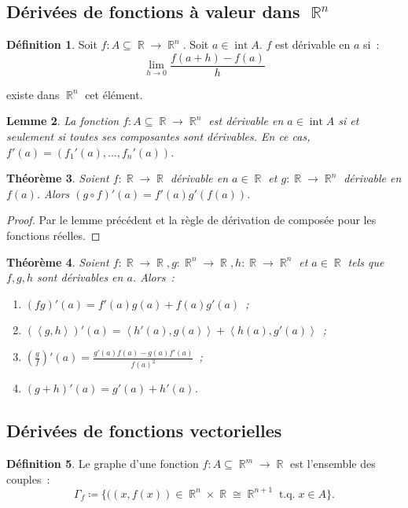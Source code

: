 \documentclass{article}
\DeclareMathOperator{\intr}{int}
\DeclareMathOperator{\R}{\mathbb R}
\DeclareMathOperator{\tq}{ t.q. }
\newcommand{\scpr}[2]{{\left\langle#1, #2\right\rangle}}
\newcommand{\frrn}[2]{#1 : #2 \subseteq \R \to \R^n}
\newcommand{\frmr}[2]{#1 : #2 \subseteq \R^m \to \R}
\newtheorem{thm}{Théorème}[section]
\newtheorem{lem}[thm]{Lemme}
\theoremstyle{definition}
\newtheorem{déf}[thm]{Définition}
\theoremstyle{remark}
\begin{document}
	\subsection{Dérivées de fonctions à valeur dans $\R^n$}

		\begin{déf} Soit $\frrn fA$. Soit $a \in \intr A$. $f$ est dérivable en $a$ si~:
		\[\lim_{h \to 0}\frac {f(a+h)-f(a)}h\]

		existe dans $\R^n$ cet élément. \end{déf}

		\begin{lem} La fonction $\frrn fA$ est dérivable en $a \in \intr A$ si et seulement si toutes ses composantes sont dérivables. En ce cas,
		$f'(a) = (f_1'(a), \ldots, f_n'(a))$. \end{lem}

		\begin{thm} Soient $f : \R \to \R$ dérivable en $a \in \R$ et $g : \R \to \R^n$ dérivable en $f(a)$. Alors $(g \circ f)'(a) = f'(a)g'(f(a))$. \end{thm}

		\begin{proof} Par le lemme précédent et la règle de dérivation de composée pour les fonctions réelles. \end{proof}

		\begin{thm} Soient $f : \R \to \R, g : \R^n \to \R, h : \R \to \R^n$ et $a \in \R$ tels que $f, g, h$ sont dérivables en $a$. Alors~:

		\begin{enumerate}
			\item $(fg)'(a) = f'(a)g(a) + f(a)g'(a)$~;
			\item $(\scpr gh)'(a) = \scpr {h'(a)}{g(a)} + \scpr {h(a)}{g'(a)}$~;
			\item $\left(\frac gf\right)'(a) = \frac {g'(a)f(a) - g(a)f'(a)}{f(a)^2}$~;
			\item $(g+h)'(a) = g'(a) + h'(a)$.
		\end{enumerate}
		\end{thm}

	\subsection{Dérivées de fonctions vectorielles}

		\begin{déf} Le graphe d'une fonction $\frmr fA$ est l'ensemble des couples~:
		\[\Gamma_f \coloneqq \{((x, f(x)) \in \R^n \times \R \cong \R^{n+1} \tq x \in A\}.\]
		\end{déf}
\end{document}
